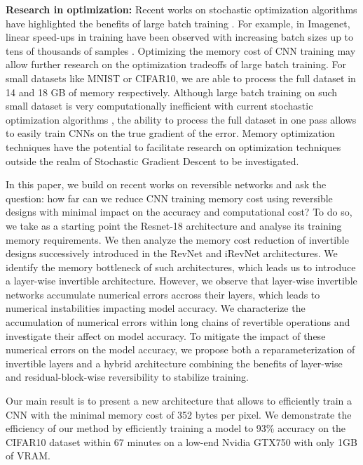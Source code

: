\documentclass[twocolumn]{bmcart}
\begin{document}
\textbf{Research in optimization:}
Recent works on stochastic optimization algorithms have highlighted the benefits of large batch training \cite{shallue2018measuring,largebatch}.
For example, in Imagenet, linear speed-ups in training have been observed with increasing batch sizes up to tens of thousands of samples \cite{largebatch}.
Optimizing the memory cost of CNN training may allow further research on the optimization tradeoffs of large batch training.
For small datasets like MNIST or CIFAR10, we are able to process the full dataset in 14 and 18 GB of memory respectively.
Although large batch training on such small dataset is very computationally inefficient with current stochastic optimization algorithms \cite{largebatch},
the ability to process the full dataset in one pass allows to easily train CNNs on the true gradient of the error.
Memory optimization techniques have the potential to facilitate research on optimization techniques outside the realm of Stochastic Gradient Descent to be investigated.

In this paper, we build on recent works on reversible networks \cite{gomez2017reversible,jacobsen2018revnet} and ask the question: 
how far can we reduce CNN training memory cost using reversible designs with minimal impact on the accuracy and computational cost?
To do so, we take as a starting point the Resnet-18 architecture and analyse its training memory requirements.
We then analyze the memory cost reduction of invertible designs successively introduced in the RevNet and iRevNet architectures.
We identify the memory bottleneck of such architectures, which leads us to introduce a layer-wise invertible architecture.
However, we observe that layer-wise invertible networks accumulate numerical errors accross their layers, which leads to numerical instabilities impacting model accuracy.  
We characterize the accumulation of numerical errors within long chains of revertible operations and investigate their affect on model accuracy.
To mitigate the impact of these numerical errors on the model accuracy, we propose both a reparameterization of invertible layers and a hybrid architecture combining the benefits of layer-wise and residual-block-wise reversibility to stabilize training.

Our main result is to present a new architecture that allows to efficiently train a CNN with the minimal memory cost of 352 bytes per pixel.
We demonstrate the efficiency of our method by efficiently training a model to 93\% accuracy on the CIFAR10 dataset within 67 minutes on a low-end Nvidia GTX750 with only 1GB of VRAM.
\end{document}
